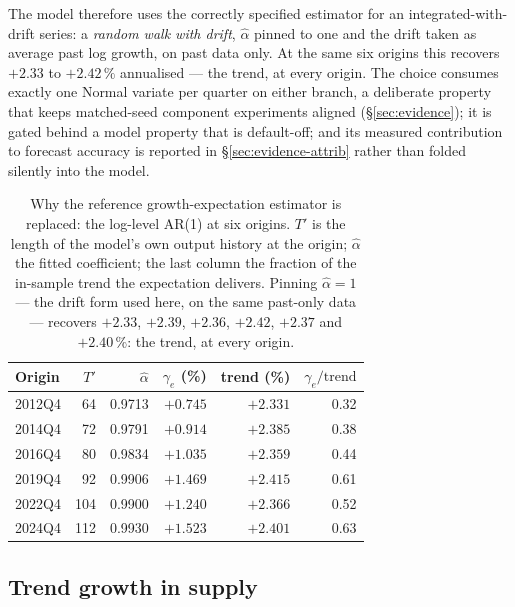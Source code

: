 \documentclass[11pt,a4paper]{article}
\begin{document}
The model therefore uses the correctly specified estimator for an integrated-with-drift series:
a \emph{random walk with drift}, $\hat\alpha$ pinned to one and the drift taken as average past
log growth, on past data only. At the same six origins this recovers $+2.33$ to $+2.42\,\%$
annualised --- the trend, at every origin. The choice consumes exactly one Normal variate per
quarter on either branch, a deliberate property that keeps matched-seed component experiments
aligned (\S\ref{sec:evidence}); it is gated behind a model property that is default-off; and its
measured contribution to forecast accuracy is reported in \S\ref{sec:evidence-attrib} rather than
folded silently into the model.

\begin{table}[t]
\centering
\caption{Why the reference growth-expectation estimator is replaced: the log-level AR(1) at six
origins. $T'$ is the length of the model's own output history at the origin; $\hat\alpha$ the
fitted coefficient; the last column the fraction of the in-sample trend the expectation delivers.
Pinning $\hat\alpha=1$ --- the drift form used here, on the same past-only data --- recovers
$+2.33$, $+2.39$, $+2.36$, $+2.42$, $+2.37$ and $+2.40\,\%$: the trend, at every origin.}
\label{tab:gammae}
\footnotesize
\begin{tabular}{@{}lrrrrr@{}}
\toprule
Origin & $T'$ & $\hat\alpha$ & $\gamma_e$ (\%) & trend (\%) & $\gamma_e/\text{trend}$ \\
\midrule
2012Q4 & 64  & 0.9713 & $+0.745$ & $+2.331$ & 0.32 \\
2014Q4 & 72  & 0.9791 & $+0.914$ & $+2.385$ & 0.38 \\
2016Q4 & 80  & 0.9834 & $+1.035$ & $+2.359$ & 0.44 \\
2019Q4 & 92  & 0.9906 & $+1.469$ & $+2.415$ & 0.61 \\
2022Q4 & 104 & 0.9900 & $+1.240$ & $+2.366$ & 0.52 \\
2024Q4 & 112 & 0.9930 & $+1.523$ & $+2.401$ & 0.63 \\
\bottomrule
\end{tabular}
\end{table}

\subsection{Trend growth in supply}
\label{sec:trendgrowth}
\end{document}

